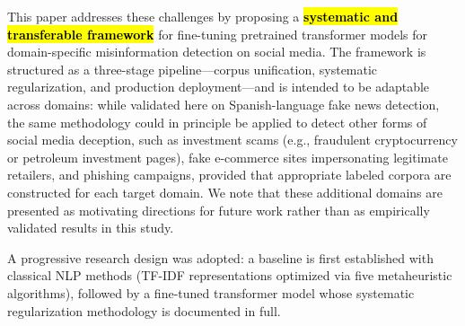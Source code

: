 \documentclass[informatics,article,accept,pdftex,moreauthors]{Definitions/mdpi}
\begin{document}
This paper addresses these challenges by proposing a \textbf{\hl{systematic and transferable framework}} for fine-tuning pretrained transformer models for domain-specific misinformation detection on social media. The framework is structured as a three-stage pipeline—corpus unification, systematic regularization, and production deployment—and is intended to be adaptable across domains: while validated here on Spanish-language fake news detection, the same methodology could in principle be applied to detect other forms of social media deception, such as investment scams (e.g., fraudulent cryptocurrency or petroleum investment pages), fake e-commerce sites impersonating legitimate retailers, and phishing campaigns, provided that appropriate labeled corpora are constructed for each target domain. We note that these additional domains are presented as motivating directions for future work rather than as empirically validated results in this study.

A progressive research design was adopted: a baseline is first established with classical NLP methods (TF-IDF representations optimized via five metaheuristic algorithms), followed by a fine-tuned transformer model whose systematic regularization methodology is documented in full.
\end{document}
